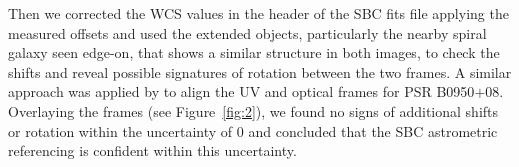 \documentclass[pdftex,twocolumn]{aastex62}
\newcommand{\old}[1]{{\color[rgb]{0.7,0,0.7}\sout{#1}}}
\newcommand{\yus}[1]{{\color[rgb]{0.5,0.1,0.5}YS: #1}}
\newcommand{\gp}[1]{{\color{blue} #1}}
\begin{document}
Then we corrected the WCS values in the header of the SBC fits file 
applying the measured offsets and used the extended objects, particularly the nearby spiral galaxy seen edge-on,
that shows a similar structure in both images, to check the shifts and reveal possible signatures of rotation between the two frames.  
A similar approach was applied by \cite{2002zhar} to align the UV and optical frames for PSR B0950$+$08. Overlaying the frames (see Figure~\ref{fig:2}), we found no signs of additional shifts or
rotation within the  uncertainty of 0 
and concluded that the SBC astrometric referencing is confident within this uncertainty.  
\end{document}
